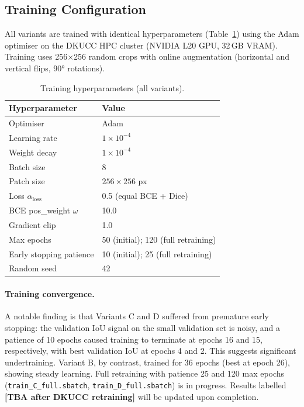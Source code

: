 \documentclass[12pt]{article}
\newcommand{\tbatxt}{\colorbox{pending}{\textbf{[TBA after DKUCC retraining]}}}
\begin{document}
\subsection{Training Configuration}

All variants are trained with identical hyperparameters (Table~\ref{tab:hparams})
using the Adam optimiser on the DKUCC HPC cluster (NVIDIA L20 GPU, 32\,GB VRAM).
Training uses 256$\times$256 random crops with online augmentation (horizontal
and vertical flips, 90° rotations).

\begin{table}[h]
\centering
\caption{Training hyperparameters (all variants).}
\label{tab:hparams}
\begin{tabular}{ll}
\toprule
\textbf{Hyperparameter} & \textbf{Value} \\
\midrule
Optimiser & Adam \\
Learning rate & $1 \times 10^{-4}$ \\
Weight decay & $1 \times 10^{-4}$ \\
Batch size & 8 \\
Patch size & $256 \times 256$ px \\
Loss $\alpha_\text{loss}$ & 0.5 (equal BCE + Dice) \\
BCE pos\_weight $\omega$ & 10.0 \\
Gradient clip & 1.0 \\
Max epochs & 50 (initial); 120 (full retraining) \\
Early stopping patience & 10 (initial); 25 (full retraining) \\
Random seed & 42 \\
\bottomrule
\end{tabular}
\end{table}

\paragraph{Training convergence.}
A notable finding is that Variants C and D suffered from premature early stopping:
the validation IoU signal on the small validation set is noisy, and a patience of
10 epochs caused training to terminate at epochs 16 and 15, respectively, with
best validation IoU at epochs 4 and 2.  This suggests significant undertraining.
Variant B, by contrast, trained for 36 epochs (best at epoch 26), showing steady
learning.  Full retraining with patience 25 and 120 max epochs
(\texttt{train\_C\_full.sbatch}, \texttt{train\_D\_full.sbatch}) is in progress.
Results labelled \tbatxt{} will be updated upon completion.
\end{document}
